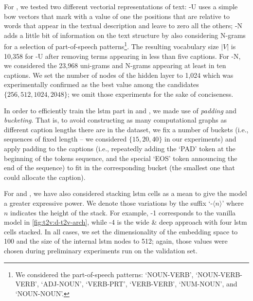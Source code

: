 For \sparsettv{}, we tested two different vectorial representations of text: \sparsettv{}\textsc{-U} uses a simple \acrlong{bow} vectors that mark with a value of one the positions that are relative to words that appear in the textual description and leave to zero all the others; \sparsettv{}\textsc{-N} adds a little bit of information on the text structure by also considering N-grams for a selection of part-of-speech patterns\footnote{We considered the part-of-speech patterns: `NOUN-VERB', `NOUN-VERB-VERB', `ADJ-NOUN', `VERB-PRT', `VERB-VERB', `NUM-NOUN', and `NOUN-NOUN'.}.
The resulting vocabulary size $|V|$ is 10,358 for \sparsettv{}\textsc{-U} after removing terms appearing in less than five captions.
For \sparsettv{}\textsc{-N}, we considered the 23,968 uni-grams and N-grams appearing at least in ten captions.
We set the number of nodes of the hidden layer to 1,024 which was experimentally confirmed as the best value among the candidates $\{ 256, 512, 1024, 2048 \}$;
we omit those experiments for the sake of conciseness.

In order to efficiently train the \gls{lstm} part in \densettv{} and \widedeepttv{}, we made use of \emph{padding} and \emph{bucketing}.
That is, to avoid constructing as many computational graphs as different caption lengths there are in the dataset, we fix a number of buckets (i.e.,  sequences of fixed length -- we considered $\{15, 20, 40\}$ in our experiments) and apply padding to the captions (i.e.,  repeatedly adding the `PAD' token at the beginning of the tokens sequence, and the special `EOS' token announcing the end of the sequence) to fit in the corresponding bucket (the smallest one that could allocate the caption).

For \densettv{} and \widedeepttv{}, we have also considered stacking \gls{lstm} cells as a mean to give the model a greater expressive power.
We denote those variations by the suffix `-$\langle n\rangle$' where $n$ indicates the height of the stack.
For example, \densettv{}-1 corresponds to the vanilla model in \ref{fig:t2v:d-t2v-arch}, while \widedeepttv{}-4 is the wide \& deep approach with four \gls{lstm} cells stacked.
In all cases, we set the dimensionality of the embedding space to 100 and the size of the internal \gls{lstm} nodes to 512;
again, those values were chosen during preliminary experiments run on the validation set.

